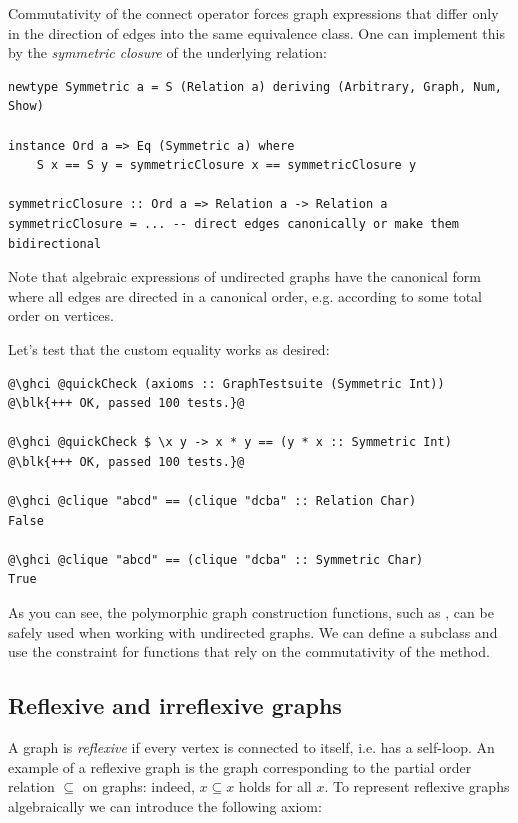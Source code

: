 Commutativity of the connect operator forces graph expressions that differ only
in the direction of edges into the same equivalence class. One can implement
this by the \emph{symmetric closure} of the underlying relation:

\begin{verbatim}
newtype Symmetric a = S (Relation a) deriving (Arbitrary, Graph, Num, Show)

instance Ord a => Eq (Symmetric a) where
    S x == S y = symmetricClosure x == symmetricClosure y

symmetricClosure :: Ord a => Relation a -> Relation a
symmetricClosure = ... -- direct edges canonically or make them bidirectional
\end{verbatim}

Note that algebraic expressions of undirected graphs have the canonical form where all
edges are directed in a canonical order, e.g. according to some total order on vertices.

Let's test that the custom equality works as desired:
\begin{verbatim}
@\ghci @quickCheck (axioms :: GraphTestsuite (Symmetric Int))
@\blk{+++ OK, passed 100 tests.}@

@\ghci @quickCheck $ \x y -> x * y == (y * x :: Symmetric Int)
@\blk{+++ OK, passed 100 tests.}@

@\ghci @clique "abcd" == (clique "dcba" :: Relation Char)
False

@\ghci @clique "abcd" == (clique "dcba" :: Symmetric Char)
True
\end{verbatim}

As you can see, the polymorphic graph construction functions, such as ,
can be safely used when working with undirected graphs. We can define a subclass
 and use the
constraint for functions that rely on the commutativity of the  method.

\subsection{Reflexive and irreflexive graphs}\label{sub-reflexive}

A graph is \emph{reflexive} if every vertex is connected to itself, i.e. has a self-loop.
An example of a reflexive graph is the graph corresponding to the partial
order relation $\subseteq$ on graphs: indeed, $x \subseteq x$ holds for all $x$. To
represent reflexive graphs algebraically we can introduce the following axiom:

